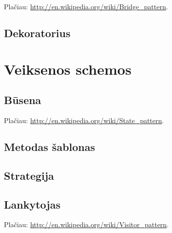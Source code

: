 
Plačiau: \url{http://en.wikipedia.org/wiki/Bridge\_pattern}.

\subsection{Dekoratorius}


\section{Veiksenos schemos}


\subsection{Būsena}


Plačiau: \url{http://en.wikipedia.org/wiki/State\_pattern}.

\subsection{Metodas šablonas}


\subsection{Strategija}


\subsection{Lankytojas}


Plačiau: \url{http://en.wikipedia.org/wiki/Visitor\_pattern}.
